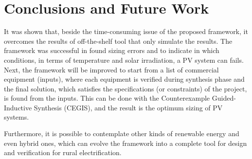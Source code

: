 \documentclass[journal]{IEEEtran}
\begin{document}
\section{Conclusions and Future Work}
%
It was shown that, beside the time-consuming issue of the proposed framework, it overcomes the results of off-the-shelf tool that only simulate the results. The framework was successful in found sizing errors and to indicate in which conditions, in terms of temperature and solar irradiation, a PV system can fails.
Next, the framework will be improved to start from a list of commercial equipment (inputs), where each equipment is verified during synthesis phase and the final solution, which satisfies the specifications (or constraints) of the project, is found from the inputs. This can be done with the Counterexample Guided-Inductive Synthesis (CEGIS), and the result is the optimum sizing of PV systems.

Furthermore, it is possible to contemplate other kinds of renewable energy and even hybrid ones, which can evolve the framework into a complete tool for design and verification for rural electrification.


\end{document}
